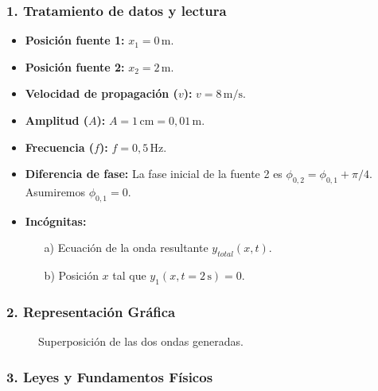 \subsubsection*{1. Tratamiento de datos y lectura}
\begin{itemize}
    \item \textbf{Posición fuente 1:} $x_1 = 0\,\text{m}$.
    \item \textbf{Posición fuente 2:} $x_2 = 2\,\text{m}$.
    \item \textbf{Velocidad de propagación ($v$):} $v = 8\,\text{m/s}$.
    \item \textbf{Amplitud ($A$):} $A = 1\,\text{cm} = 0,01\,\text{m}$.
    \item \textbf{Frecuencia ($f$):} $f = 0,5\,\text{Hz}$.
    \item \textbf{Diferencia de fase:} La fase inicial de la fuente 2 es $\phi_{0,2} = \phi_{0,1} + \pi/4$. Asumiremos $\phi_{0,1}=0$.
    \item \textbf{Incógnitas:}
    \begin{enumerate}
        \item[a)] Ecuación de la onda resultante $y_{total}(x,t)$.
        \item[b)] Posición $x$ tal que $y_1(x, t=2\,\text{s})=0$.
    \end{enumerate}
\end{itemize}

\subsubsection*{2. Representación Gráfica}
\begin{figure}[H]
    \centering
    \caption{Superposición de las dos ondas generadas.}
\end{figure}

\subsubsection*{3. Leyes y Fundamentos Físicos}
